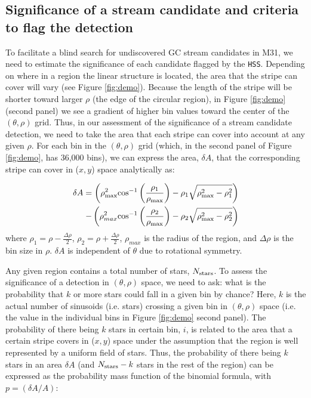 \documentclass[twocolumn]{aastex631}
\begin{document}
\subsection{Significance of a stream candidate and criteria to flag the detection}\label{sec:bkg}
To facilitate a blind search for undiscovered GC stream candidates in M31, we need to estimate the significance of each candidate flagged by the \texttt{HSS}. Depending on where in a region the linear structure is located, the area that the stripe can cover will vary (see Figure \ref{fig:demo}). Because the length of the stripe will be shorter toward larger $\rho$ (the edge of the circular region), in Figure \ref{fig:demo} (second panel) we see a gradient of higher bin values toward the center of the $(\theta,\rho)$ grid. Thus, in our assessment of the significance of a stream candidate detection, we need to take the area that each stripe can cover into account at any given $\rho$. For each bin in the $(\theta,\rho)$ grid (which, in the second panel of Figure \ref{fig:demo}, has 36,000 bins), we can express the area, $\delta A$, that the corresponding stripe can cover in ($x,y$) space analytically as:

\begin{equation}\label{eq:dA}
\begin{aligned}
    \delta A = \left( \rho_{\rm max}^2{\rm cos}^{-1}\left(\frac{\rho_1}{\rho_{\rm max}}\right) - \rho_1\sqrt{\rho_{\rm max}^2 - \rho_1^2}\right)\\
    -  \left( \rho_{max}^2{\rm cos}^{-1}\left(\frac{\rho_2}{\rho_{\rm max}}\right) - \rho_2\sqrt{\rho_{\rm max}^2 - \rho_2^2}\right)
\end{aligned}
\end{equation}
where 
$\rho_1 = \rho - \frac{\Delta \rho}{2}$,  $  \rho_2 =  \rho + \frac{\Delta \rho}{2}$, 
$\rho_{max}$ is the radius of the region, and $\Delta \rho$ is the bin size in $\rho$. $\delta A$ is independent of $\theta$ due to rotational symmetry. 

Any given region contains a total number of stars, $N_{\rm stars}$. To assess the significance of a detection in $(\theta,\rho)$ space, we need to ask: what is the probability that $k$ or more stars could fall in a given bin by chance? Here, $k$ is the actual number of sinusoids (i.e. stars) crossing a given bin in $(\theta,\rho)$ space (i.e. the value in the individual bins in Figure \ref{fig:demo} second panel). The probability of there being $k$ stars in certain bin, $i$, is related to the area that a certain stripe covers in ($x,y$) space under the assumption that the region is well represented by a uniform field of stars. Thus, the probability of there being $k$ stars in an area $\delta A$ (and $N_{\rm stars}-k$ stars in the rest of the region) can be expressed as the probability mass function of the binomial formula, with $p =(\delta A/A)$:
\end{document}
